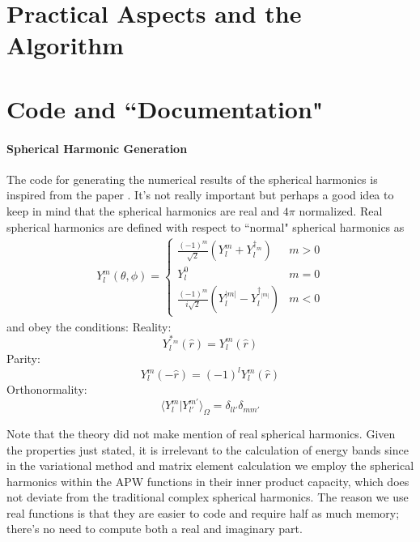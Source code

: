 \documentclass[11pt]{article}
\numberwithin{equation}{section}
\begin{document}
\section{Practical Aspects and the Algorithm}

\section{Code and ``Documentation"}

\paragraph{Spherical Harmonic Generation}
The code for generating the numerical results of the spherical harmonics is inspired from the paper \cite{spherHarm}. It's not really important but perhaps a good idea to keep in mind that the spherical harmonics are real and $4\pi$ normalized. Real spherical harmonics are defined with respect to ``normal" spherical harmonics as 
\begin{align}
Y_l^m(\theta,\phi) = \left\{
  \begin{array}{lr}
    \frac{(-1)^m}{\sqrt{2}}(Y_l^m + Y_l^{\dagger_m}) & m > 0 \\
    Y_l^0 & m = 0 \\
    \frac{(-1)^m}{i\sqrt{2}}(Y_l^{|m|} - Y_l^{\dagger_{|m|}}) & m < 0
  \end{array}
\right.
\end{align}
and obey the conditions:
Reality:
\begin{equation}
Y_l^{*_m}(\hat{r}) = Y_l^m(\hat{r})
\end{equation}
Parity:
\begin{equation}
Y_l^m(-\hat{r}) = (-1)^lY_l^m(\hat{r})
\end{equation}
Orthonormality:
\begin{equation}
\langle Y_l^m|Y_{l'}^{m'}\rangle_{\Omega} = \delta_{ll'}\delta_{mm'}
\end{equation}

Note that the theory did not make mention of real spherical harmonics. Given the properties just stated, it is irrelevant to the calculation of energy bands since in the variational method and matrix element calculation we employ the spherical harmonics within the APW functions in their inner product capacity, which does not deviate from the traditional complex spherical harmonics. The reason we use real functions is that they are easier to code and require half as much memory; there's no need to compute both a real and imaginary part.
\end{document}
